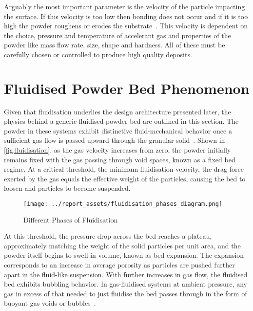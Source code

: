 Arguably the most important parameter is the velocity of the particle impacting the surface. If this velocity is too low then bonding does not occur and if it is too high the powder roughens or erodes the substrate~\cite{Guo2022}. This velocity is dependent on the choice, pressure and temperature of accelerant gas and properties of the powder like mass flow rate, size, shape and hardness. All of these must be carefully chosen or controlled to produce high quality deposits.

\newpage

\section{Fluidised Powder Bed Phenomenon}\label{sec:background-powder-beds}
Given that fluidisation underlies the design architecture presented later, the physics behind a generic fluidised powder bed are outlined in this section. The powder in these systems exhibit distinctive fluid-mechanical behavior once a sufficient gas flow is passed upward through the granular solid~\cite{KuniiLevenspiel1977}. Shown in \autoref{fig:fluidisation}, as the gas velocity increases from zero, the powder initially remains fixed with the gas passing through void spaces, known as a fixed bed regime. At a critical threshold, the minimum fluidisation velocity, the drag force exerted by the gas equals the effective weight of the particles, causing the bed to loosen and particles to become suspended.
\begin{figure}[htbp]
    \centering
    
    \begin{minipage}{0.63\textwidth}
        \centering
        \texttt{[image: ../report\_assets/fluidisation\_phases\_diagram.png]}
        \caption{Different Phases of Fluidisation~\cite{klaren2021fluidization}}
    \end{minipage}
    
\end{figure}\label{fig:fluidisation}
At this threshold, the pressure drop across the bed reaches a plateau, approximately matching the weight of the solid particles per unit area, and the powder itself begins to swell in volume, known as bed expansion. The expansion corresponds to an increase in average porosity as particles are pushed further apart in the fluid-like suspension. With further increases in gas flow, the fluidised bed exhibits bubbling behavior. In gas-fluidised systems at ambient pressure, any gas in excess of that needed to just fluidise the bed passes through in the form of buoyant gas voids or bubbles~\cite{SHENG2022137168}.

